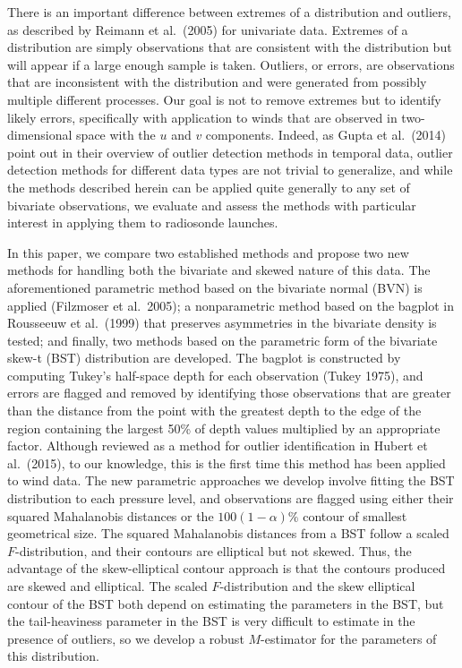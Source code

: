 \documentclass[12pt]{article}
\begin{document}
\begin{doublespacing}
There is an important difference between extremes of a distribution and outliers, as described by Reimann et al.~(2005) for univariate data.  Extremes of a distribution are simply observations that are consistent with the distribution but  will appear if a large enough sample is taken.  Outliers, or errors, are observations that are inconsistent with the distribution and were generated from possibly multiple different processes.  Our goal is not to remove extremes but to identify likely errors, specifically with application to winds that are observed in two-dimensional space with the $u$ and $v$ components.    Indeed, as Gupta et al.~(2014) point out in their overview of outlier detection methods in temporal data, outlier detection methods for different data types are not trivial to generalize, and while the methods described herein can be applied quite generally to any set of bivariate observations, we evaluate and assess the methods with particular interest in applying them to radiosonde launches.  

In this paper, we compare two established methods and propose two new methods for handling both the bivariate and skewed nature of this data.  The aforementioned parametric method based on the bivariate normal (BVN) is applied (Filzmoser et al.~2005);  a nonparametric method based on the bagplot in Rousseeuw et al.~(1999) that preserves asymmetries in the bivariate density is tested; and finally, two  methods based on the parametric form of  the bivariate skew-t (BST) distribution are developed.  The bagplot is constructed by computing Tukey's half-space depth for each observation (Tukey 1975), and   errors are flagged and removed by identifying those observations that are greater than  the distance from the point with the greatest  depth to the edge of the region containing the largest 50\% of depth values multiplied by an appropriate factor.  Although reviewed as a method for outlier identification  in Hubert et al.~(2015), to our knowledge, this is the first time this method has been applied to wind data. The new parametric approaches we develop involve fitting the BST distribution to each pressure level, and  observations are flagged using either their squared Mahalanobis distances or the $100(1-\alpha)\%$ contour of smallest geometrical size.  The squared Mahalanobis distances from a BST follow a  scaled $F$-distribution, and their contours are elliptical but not skewed.  Thus, the   advantage of the skew-elliptical contour approach is that the contours produced are skewed and elliptical. The scaled $F$-distribution and the skew elliptical contour of the BST both depend on estimating the parameters in the BST,  but the tail-heaviness parameter in the BST  is very difficult to estimate in the presence of outliers, so we develop a robust $M$-estimator for the parameters of this distribution.  




\end{doublespacing}
\end{document}
